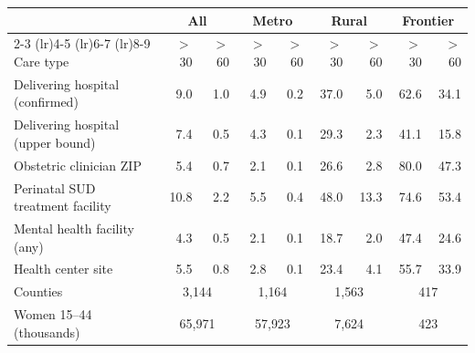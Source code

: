 \begin{tabular}{@{}lrrrrrrrr@{}}
\toprule
 & \multicolumn{2}{c}{All} & \multicolumn{2}{c}{Metro} & \multicolumn{2}{c}{Rural} & \multicolumn{2}{c}{Frontier} \\
\cmidrule(lr){2-3} \cmidrule(lr){4-5} \cmidrule(lr){6-7} \cmidrule(lr){8-9}
Care type & $>$30 & $>$60 & $>$30 & $>$60 & $>$30 & $>$60 & $>$30 & $>$60 \\
\midrule
Delivering hospital (confirmed) & 9.0 & 1.0 & 4.9 & 0.2 & 37.0 & 5.0 & 62.6 & 34.1 \\
Delivering hospital (upper bound) & 7.4 & 0.5 & 4.3 & 0.1 & 29.3 & 2.3 & 41.1 & 15.8 \\
Obstetric clinician ZIP & 5.4 & 0.7 & 2.1 & 0.1 & 26.6 & 2.8 & 80.0 & 47.3 \\
Perinatal SUD treatment facility & 10.8 & 2.2 & 5.5 & 0.4 & 48.0 & 13.3 & 74.6 & 53.4 \\
Mental health facility (any) & 4.3 & 0.5 & 2.1 & 0.1 & 18.7 & 2.0 & 47.4 & 24.6 \\
Health center site & 5.5 & 0.8 & 2.8 & 0.1 & 23.4 & 4.1 & 55.7 & 33.9 \\
\midrule
Counties & \multicolumn{2}{c}{3{,}144} & \multicolumn{2}{c}{1{,}164} & \multicolumn{2}{c}{1{,}563} & \multicolumn{2}{c}{417} \\
Women 15--44 (thousands) & \multicolumn{2}{c}{65{,}971} & \multicolumn{2}{c}{57{,}923} & \multicolumn{2}{c}{7{,}624} & \multicolumn{2}{c}{423} \\
\bottomrule
\end{tabular}
